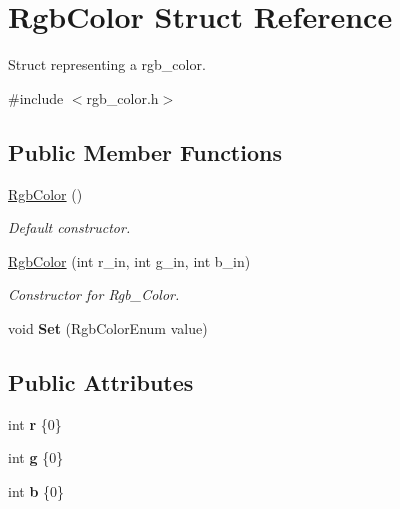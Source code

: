 \hypertarget{struct_rgb_color}{}\section{Rgb\+Color Struct Reference}
\label{struct_rgb_color}


Struct representing a rgb\+\_\+color.  




{\ttfamily \#include $<$rgb\+\_\+color.\+h$>$}

\subsection*{Public Member Functions}
\begin{DoxyCompactItemize}
\item 
\mbox{\hyperlink{struct_rgb_color_a264da0270aca412d62197e046b71b08e}{Rgb\+Color}} ()
\begin{DoxyCompactList}\small\item\em Default constructor. \end{DoxyCompactList}\item 
\mbox{\hyperlink{struct_rgb_color_a61e213533bfff019aebd27f991688222}{Rgb\+Color}} (int r\+\_\+in, int g\+\_\+in, int b\+\_\+in)
\begin{DoxyCompactList}\small\item\em Constructor for Rgb\+\_\+\+Color. \end{DoxyCompactList}\item 
\mbox{\label{struct_rgb_color_a57fcd9161e0ee6a38e707c5002db55b8}} 
void {\bfseries Set} (Rgb\+Color\+Enum value)
\end{DoxyCompactItemize}
\subsection*{Public Attributes}
\begin{DoxyCompactItemize}
\item 
\mbox{\label{struct_rgb_color_aa6c2fac108029c79f7cc96fb6d34717f}} 
int {\bfseries r} \{0\}
\item 
\mbox{\label{struct_rgb_color_afbc54745bd4ed7ede168e31922143eff}} 
int {\bfseries g} \{0\}
\item 
\mbox{\label{struct_rgb_color_af1ba4837230cfc3b0f31454ccdb03df6}} 
int {\bfseries b} \{0\}
\end{DoxyCompactItemize}


